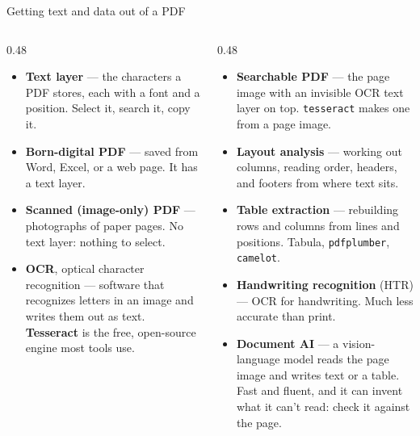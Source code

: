 \documentclass[9pt,aspectratio=169]{beamer}
\begin{document}
\begin{frame}{Getting text and data out of a PDF}
    \begin{columns}[T]
        \begin{column}{0.48\textwidth}
            \begin{itemize}\small
                \item \textbf{Text layer} --- the characters a PDF stores, each with a font and a position. Select it, search it, copy it.
                \item \textbf{Born-digital PDF} --- saved from Word, Excel, or a web page. It has a text layer.
                \item \textbf{Scanned (image-only) PDF} --- photographs of paper pages. No text layer: nothing to select.
                \item \textbf{OCR}, optical character recognition --- software that recognizes letters in an image and writes them out as text. \textbf{Tesseract} is the free, open-source engine most tools use.
            \end{itemize}
        \end{column}
        \begin{column}{0.48\textwidth}
            \begin{itemize}\small
                \item \textbf{Searchable PDF} --- the page image with an invisible OCR text layer on top. \texttt{tesseract} makes one from a page image.
                \item \textbf{Layout analysis} --- working out columns, reading order, headers, and footers from where text sits.
                \item \textbf{Table extraction} --- rebuilding rows and columns from lines and positions. Tabula, \texttt{pdfplumber}, \texttt{camelot}.
                \item \textbf{Handwriting recognition} (HTR) --- OCR for handwriting. Much less accurate than print.
                \item \textbf{Document AI} --- a vision-language model reads the page image and writes text or a table. Fast and fluent, and it can invent what it can't read: check it against the page.
            \end{itemize}
        \end{column}
    \end{columns}
\end{frame}
\end{document}

